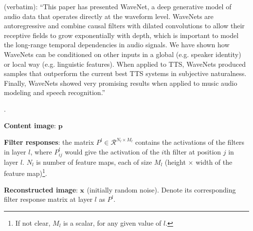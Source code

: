 \documentclass[11pt]{article}
\renewcommand\vec[2][]{\bm{#2}_{#1}}
\newcommand\myspace[1][]{\vspace{#1\bigskipamount}}
\newcommand\p{\Needspace{10\baselineskip} \noindent}
\begin{document}
\myspace
\p {} (verbatim): ``This paper has presented WaveNet, a deep generative model of audio data that operates directly at the waveform level. WaveNets are autoregressive and combine causal filters with dilated convolutions to allow their receptive fields to grow exponentially with depth, which is important to model the long-range temporal dependencies in audio signals. We have shown how WaveNets can be conditioned
on other inputs in a global (e.g. speaker identity) or local way (e.g. linguistic features). When applied to TTS, WaveNets produced samples that outperform the current best TTS systems in subjective naturalness. Finally, WaveNets showed very promising results when applied to music audio modeling and speech recognition.''





\p {}. 
\begin{compactitem}
	\item \textbf{Content image}: $\vec{p}$
	\item \textbf{Filter responses}: the matrix $P^l \in \mathcal{R}^{N_l \times M_l}$ contains the activations of the filters in layer $l$, where $P_{ij}^l$ would give the activation of the $i$th filter at position $j$ in layer $l$. $N_l$ is number of feature maps, each of size $M_l$ (height $\times$ width of the feature map)\footnote{If not clear, $M_l$ is a scalar, for any given value of $l$.}.
	\item \textbf{Reconstructed image}: $\vec{x}$ (initially random noise). Denote its corresponding filter response matrix at layer $l$ as $P^l$. 
\end{compactitem}
\end{document}

